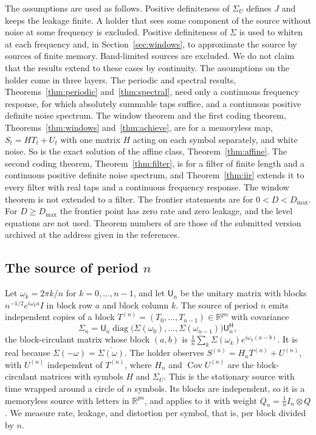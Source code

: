 \documentclass[11pt,onecolumn]{IEEEtran}
\newcommand{\R}{\mathbb{R}}
\newcommand{\Cov}{\operatorname{Cov}}
\newcommand{\herm}{\mathsf H}
\begin{document}
The assumptions are used as follows. Positive definiteness of
$\Sigma_U$ defines $J$ and keeps the leakage finite. A holder that sees
some component of the source without noise at some frequency is
excluded. Positive definiteness of $\Sigma$ is used to whiten at each
frequency and, in Section~\ref{sec:windows}, to approximate the source
by sources of finite memory. Band-limited sources are excluded. We do
not claim that the results extend to these cases by continuity. The
assumptions on the holder come in three layers. The periodic and
spectral results, Theorems~\ref{thm:periodic} and~\ref{thm:spectral},
need only a continuous frequency response, for which absolutely
summable taps suffice, and a continuous positive definite noise
spectrum. The window theorem and the first coding theorem,
Theorems~\ref{thm:windows} and~\ref{thm:achieve}, are for a memoryless
map, $S_t=HT_t+U_t$ with one matrix $H$ acting on each symbol
separately, and white noise. So is the exact solution of the affine
class, Theorem~\ref{thm:affine}. The second coding theorem,
Theorem~\ref{thm:filter}, is for a filter of finite length and a
continuous positive definite noise spectrum, and
Theorem~\ref{thm:iir} extends it to every filter with real taps and a
continuous frequency response. The window theorem is not extended to a
filter. The frontier
statements are for $0<D<D_{\max}$. For $D\ge D_{\max}$ the frontier point
has zero rate and zero leakage, and the level equations are not used.
Theorem numbers of \cite{part1} are those of the submitted version
archived at the address given in the references.

\subsection{The source of period $n$}

Let $\omega_k=2\pi k/n$ for $k=0,\dots,n-1$, and let
$\mathsf U_n$ be the unitary matrix with blocks
$n^{-1/2}e^{i\omega_ka}I$ in block row $a$ and block column $k$. The
source of period $n$ emits independent copies of a block
$T^{(n)}=(T_0,\dots,T_{n-1})\in\R^{pn}$ with covariance
\[
\Sigma_n=\mathsf U_n\operatorname{diag}\bigl(\Sigma(\omega_0),\dots,\Sigma(\omega_{n-1})\bigr)\mathsf U_n^{\herm},
\]
the block-circulant matrix whose block $(a,b)$ is
$\tfrac1n\sum_k\Sigma(\omega_k)e^{i\omega_k(a-b)}$. It is real because
$\Sigma(-\omega)=\overline{\Sigma(\omega)}$. The holder observes
$S^{(n)}=H_nT^{(n)}+U^{(n)}$, with $U^{(n)}$ independent of $T^{(n)}$, where $H_n$ and $\Cov U^{(n)}$ are the
block-circulant matrices with symbols $H$ and $\Sigma_U$. This is the
stationary source with time wrapped around a circle of $n$ symbols. Its
blocks are independent, so it is a memoryless source with letters in
$\R^{pn}$, and \cite[Theorem~3]{part1} applies to it with weight
$Q_n=\tfrac1nI_n\otimes Q$. We measure rate, leakage, and distortion per
symbol, that is, per block divided by $n$.
\end{document}
